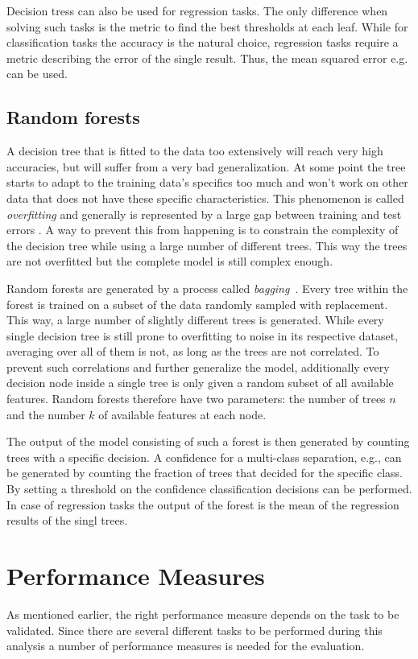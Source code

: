 Decision tress can also be used for regression tasks. The only difference when
solving such tasks is the metric to find the best thresholds at each leaf.
While for classification tasks the accuracy is the natural choice, regression
tasks require a metric describing the error of the single result. Thus, the
mean squared error e.g. can be used.

\subsection{Random forests}
%
A decision tree that is fitted to the data too extensively will reach
very high accuracies, but will suffer from a very bad generalization. At some
point the tree starts to adapt to the training data's specifics too much and
won't work on other data that does not have these specific characteristics.
This phenomenon is called \textit{overfitting} and generally is represented by
a large gap between training and test errors \cite{goodfellow}. A way to
prevent this from happening is to constrain the complexity of the decision tree
while using a large number of different trees. This way the trees are not
overfitted but the complete model is still complex enough.

Random forests are generated by a process called
\textit{bagging}~\cite{bagging}. Every tree within the forest is trained on a
subset of the data randomly sampled with replacement. This way, a large number
of slightly different trees is generated. While every single decision tree is
still prone to overfitting to noise in its respective dataset, averaging over
all of them is not, as long as the trees are not correlated. To prevent such
correlations and further generalize the model, additionally every decision node
inside a single tree is only given a random subset of all available features.
Random forests therefore have two parameters: the number of trees $n$ and the
number $k$ of available features at each node.

The output of the model consisting of such a forest is then generated
by counting trees with a specific decision. A confidence for a multi-class
separation, e.g., can be generated by counting the fraction of trees that
decided for the specific class. By setting a threshold on the confidence
classification decisions can be performed. In case of regression tasks the
output of the forest is the mean of the regression results of the singl trees.

\section{Performance Measures}
%
As mentioned earlier, the right performance measure depends on the task to be
validated. Since there are several different tasks to be performed during this
analysis a number of performance measures is needed for the evaluation.

